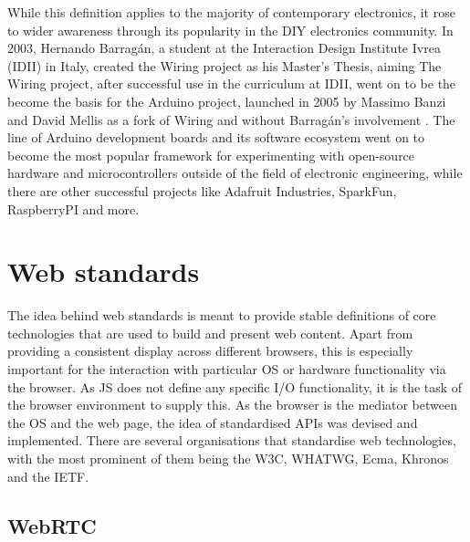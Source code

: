 While this definition applies to the majority of contemporary electronics, it rose to wider awareness through its popularity in the \ac{DIY} electronics community. In 2003, Hernando Barragán, a student at the Interaction Design Institute Ivrea (IDII) in Italy, created the Wiring project as his Master's Thesis, aiming  The Wiring project, after successful use in the curriculum at IDII, went on to be the become the basis for the Arduino project, launched in 2005 by Massimo Banzi and David Mellis as a fork of Wiring and without Barragán's involvement \parencite{arduinoHistory}. The line of Arduino development boards and its software ecosystem went on to become the most popular framework for experimenting with open-source hardware and microcontrollers outside of the field of electronic engineering, while there are other successful projects like Adafruit Industries, SparkFun, RaspberryPI and more.


\section{Web standards}
\label{section:webStandards}

The idea behind web standards is meant to provide stable definitions of core technologies that are used to build and present web content. Apart from providing a consistent display across different browsers, this is especially important for the interaction with particular \ac{OS} or hardware functionality via the browser. As \ac{JS} does not define any specific \ac{I/O} functionality, it is the task of the browser environment to supply this. As the browser is the mediator between the \ac{OS} and the web page, the idea of standardised \ac{API}s was devised and implemented. There are several organisations that standardise web technologies, with the most prominent of them being the \ac{W3C}, \ac{WHATWG}, Ecma, Khronos and the \ac{IETF}.

\subsection{WebRTC}

